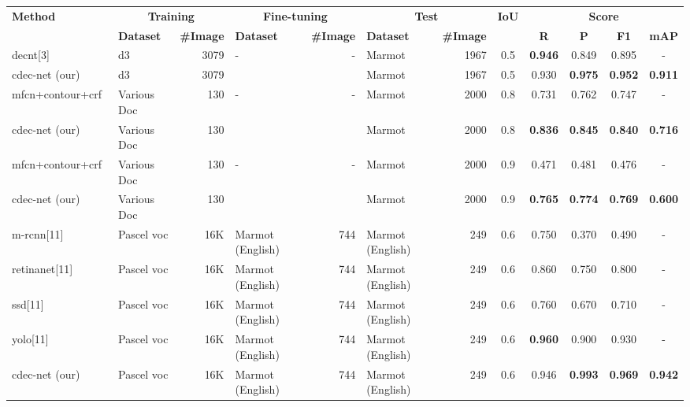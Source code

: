 \documentclass[a4paper,conference]{IEEEtran}
\begin{document}
\begin{table*}[ht!]
\addtolength{\tabcolsep}{-2.7pt}
\begin{center}
\begin{tabular}{|l| l | r|l |r|l|r| c| c c c c|} \hline
\textbf{Method} &\multicolumn{2}{|c|}{\textbf{Training}} &\multicolumn{2}{|c|}{\textbf{Fine-tuning}} &\multicolumn{2}{|c|}{\textbf{Test}} &\textbf{IoU} & \multicolumn{4}{|c|}{\textbf{Score}} \\ \cline{2-7} \cline{9-12}
  &\textbf{Dataset} &\textbf{\#Image} &\textbf{Dataset} &\textbf{\#Image} &\textbf{Dataset} &\textbf{\#Image} &  &\textbf{R} &\textbf{P} &\textbf{F1} &\textbf{mAP} \\ \hline  
{\sc d}e{\sc cnt}[3] &{\sc d3} &3079 &- &- &Marmot &1967 &0.5 &\textbf{0.946} &0.849 &0.895 &- \\ 
{\sc cd}e{\sc c-n}et (our) &{\sc d3} &3079 & & &Marmot &1967 &0.5 &0.930 &\textbf{0.975} &\textbf{0.952} &\textbf{0.911} \\ \hhline{|=|=|=|=|=|=|=|=|====|}
{\sc mfcn}+contour+{\sc crf}~\cite{he2017multi} &Various Doc &130 &- &- &Marmot &2000 &0.8 &0.731 &0.762 &0.747 &- \\ 
{\sc cd}e{\sc c-n}et (our) &Various Doc &130 & & &Marmot &2000 &0.8 &\textbf{0.836} &\textbf{0.845} &\textbf{0.840} &\textbf{0.716}  \\ \hhline{|=|=|=|=|=|=|=|=|====|}
{\sc mfcn}+contour+{\sc crf}~\cite{he2017multi} &Various Doc &130 &- &- &Marmot &2000 &0.9 &0.471 &0.481 &0.476 &- \\ 
{\sc cd}e{\sc c-n}et (our) &Various Doc &130 & & &Marmot &2000 &0.9 &\textbf{0.765} &\textbf{0.774} &\textbf{0.769} &\textbf{0.600} \\ \hhline{|=|=|=|=|=|=|=|=|====|}
{\sc m-rcnn}[11] &Pascel {\sc voc} &16K &Marmot (English) &744 &Marmot (English) &249 &0.6 &0.750 &0.370 &0.490 &- \\
{\sc r}etina{\sc n}et[11] &Pascel {\sc voc} &16K &Marmot (English) &744 &Marmot (English) &249 &0.6 &0.860 &0.750 &0.800 &- \\
{\sc ssd}[11] &Pascel {\sc voc} &16K &Marmot (English) &744 &Marmot (English) &249 &0.6 &0.760 &0.670 &0.710 &- \\
{\sc yolo}[11] &Pascel {\sc voc} &16K &Marmot (English) &744 &Marmot (English) &249 &0.6 &\textbf{0.960} &0.900 &0.930 &- \\
{\sc cd}e{\sc c-n}et (our) &Pascel {\sc voc} &16K &Marmot (English) &744 &Marmot (English) &249 &0.6 &0.946 &\textbf{0.993} &\textbf{0.969} &\textbf{0.942} \\ 

\end{tabular}
\end{center}
\end{table*}
\end{document}
